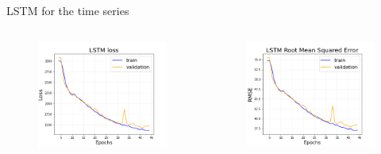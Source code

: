 \documentclass{beamer}
\begin{document}
\begin{frame}{LSTM for the time series}
    \begin{columns}
        \begin{figure}
            \centering
            \includegraphics[width=\textwidth]{figures/lstm_loss.png}
        \end{figure}
        
        \begin{figure}
            \centering
            \includegraphics[width=\textwidth]{figures/lstm_rmse.png}
        \end{figure}
        \end{columns}
\end{frame}
\end{document}
